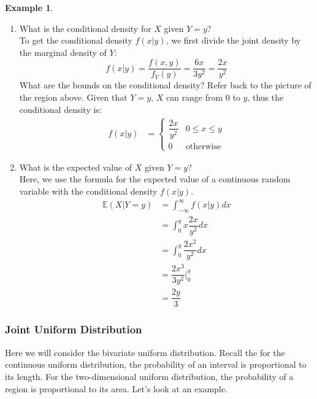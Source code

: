 \documentclass[12pt]{article}
\theoremstyle{definition}
\newtheorem*{example}{Example}
\theoremstyle{remark}
\def\E{{\mathbb E}}
\begin{document}
\begin{example}
\begin{enumerate}
\item What is the conditional density for $X$ given $Y = y$?\\

To get the conditional density $f(x|y)$, we first divide the joint density by the marginal density of $Y$:
\[
f(x|y) = \frac{ f(x, y) }{f_Y(y)} = \frac{ 6 x }{ 3 y^2 } = \frac{ 2 x }{ y^2 }
\]
What are the bounds on the conditional density? Refer back to the picture of the region above. Given that $Y = y$, $X$ can range from 0 to $y$, thus the conditional density is:
\begin{align*}
f(x|y) &=  \begin{cases} 
      \dfrac{ 2 x }{ y^2 } & 0 \leq x \leq y \\
      0 & \textrm{otherwise}
   \end{cases}
\end{align*}

\item What is the expected value of $X$ given $Y = y$?\\

Here, we use the formula for the expected value of a continuous random variable with the conditional density $f(x|y)$.
\begin{align*}
\E(X|Y = y) &= \int_{-\infty}^\infty f(x|y) dx \\
&= \int_0^y x \dfrac{ 2 x }{ y^2 } dx \\
&= \int_0^y \dfrac{ 2 x^2 }{ y^2 } dx \\
&= \dfrac{2x^3}{3 y^2}\Bigr|_0^y \\
&= \dfrac{2y}{3}
\end{align*}

\end{enumerate}
\end{example}


\subsubsection{Joint Uniform Distribution}
Here we will consider the bivariate uniform distribution. Recall the for the continuous uniform distribution, the probability of an interval is proportional to its length. For the two-dimensional uniform distribution, the probability of a region is proportional to its area. Let's look at an example.
\end{document}
